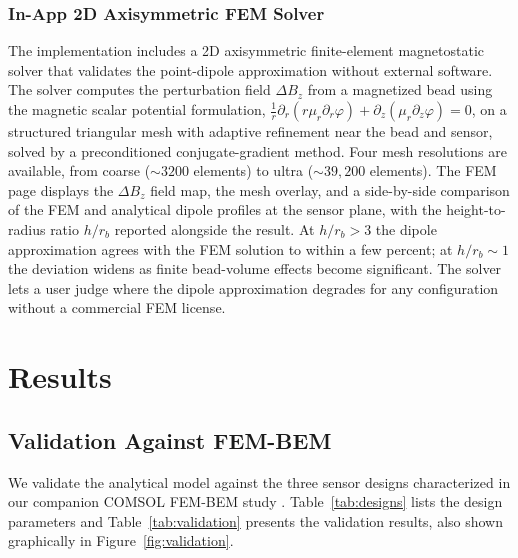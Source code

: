\documentclass[biosensors,article,submit,pdftex,moreauthors]{Definitions/mdpi}
\begin{document}
\subsubsection{In-App 2D Axisymmetric FEM Solver}
\label{sec:fem}

The implementation includes a 2D axisymmetric finite-element magnetostatic solver
that validates the point-dipole approximation without external software. The solver
computes the perturbation field $\Delta B_z$ from a magnetized bead using the
magnetic scalar potential formulation,
$\tfrac{1}{r}\partial_r(r\mu_r\partial_r\varphi) + \partial_z(\mu_r\partial_z\varphi)
= 0$, on a structured triangular mesh with adaptive refinement near the bead and
sensor, solved by a preconditioned conjugate-gradient method. Four mesh resolutions
are available, from coarse (${\sim}3200$ elements) to ultra (${\sim}39{,}200$
elements). The FEM page displays the $\Delta B_z$ field map, the mesh overlay, and a
side-by-side comparison of the FEM and analytical dipole profiles at the sensor
plane, with the height-to-radius ratio $h/r_b$ reported alongside the result. At
$h/r_b > 3$ the dipole approximation agrees with the FEM solution to within a few
percent; at $h/r_b \sim 1$ the deviation widens as finite bead-volume effects become
significant. The solver lets a user judge where the dipole approximation degrades for
any configuration without a commercial FEM license.

\section{Results}
\label{sec:results}

\subsection{Validation Against FEM-BEM}
\label{sec:validation}

We validate the analytical model against the three sensor designs characterized in
our companion COMSOL FEM-BEM study \cite{govindaraju2025}.
Table~\ref{tab:designs} lists the design parameters and Table~\ref{tab:validation}
presents the validation results, also shown graphically in
Figure~\ref{fig:validation}.
\end{document}
